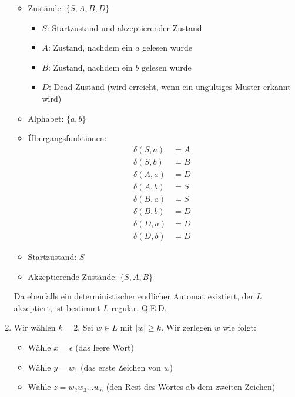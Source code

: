 \documentclass{uebungsblatt}
\begin{document}
\begin{loesung}
\begin{enumerate}
		      \begin{itemize}
			      \item Zustände: $\{S, A, B, D\}$
			            \begin{itemize}
				            \item $S$: Startzustand und akzeptierender Zustand
				            \item $A$: Zustand, nachdem ein $a$ gelesen wurde
				            \item $B$: Zustand, nachdem ein $b$ gelesen wurde
				            \item $D$: Dead-Zustand (wird erreicht, wenn ein ungültiges Muster erkannt wird)
			            \end{itemize}
			      \item Alphabet: $\{a, b\}$
			      \item Übergangsfunktionen:
			            \begin{align*}
				            \delta(S, a) & = A \\
				            \delta(S, b) & = B \\
				            \delta(A, a) & = D \\
				            \delta(A, b) & = S \\
				            \delta(B, a) & = S \\
				            \delta(B, b) & = D \\
				            \delta(D, a) & = D \\
				            \delta(D, b) & = D
			            \end{align*}
			      \item Startzustand: $S$
			      \item Akzeptierende Zustände: $\{S, A, B\}$
		      \end{itemize}

		      Da ebenfalls ein deterministischer endlicher Automat existiert, der $L$ akzeptiert, ist bestimmt $L$ regulär. Q.E.D.

		\item
		      Wir wählen $k = 2$. Sei $w \in L$ mit $|w| \geq k$. Wir zerlegen $w$ wie folgt:

		      \begin{itemize}
			      \item Wähle $x = \epsilon$ (das leere Wort)
			      \item Wähle $y = w_1$ (das erste Zeichen von $w$)
			      \item Wähle $z = w_2w_3\ldots w_n$ (den Rest des Wortes ab dem zweiten Zeichen)
		      \end{itemize}


\end{enumerate}
\end{loesung}
\end{document}
